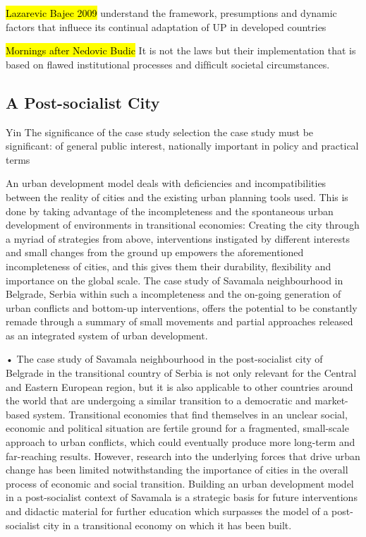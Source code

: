 \documentclass[11pt]{report}
\begin{document}
\hl{Lazarevic Bajec 2009}
understand the framework, presumptions and dynamic factors that influece its continual adaptation of UP in developed countries

\hl{Mornings after Nedovic Budic}
It is not the laws but their implementation that is based on ﬂawed institutional processes and difﬁcult societal circumstances.

\subsection{A Post-socialist City}

Yin
The significance of the case study selection
the case study must be significant: of general public interest, nationally important in policy and practical terms

An urban development model deals with deficiencies and incompatibilities between the reality of cities and the existing urban planning tools used. This is done by taking advantage of the incompleteness and the spontaneous urban development of environments in transitional economies: Creating the city through a myriad of strategies from above, interventions instigated by different interests and small changes from the ground up empowers the aforementioned incompleteness of cities, and this gives them their durability, flexibility and importance on the global scale. The case study of Savamala neighbourhood in Belgrade, Serbia within such a incompleteness and the on-going generation of urban conflicts and bottom-up interventions, offers the potential to be constantly remade through a summary of small movements and partial approaches released as an integrated system of urban development.

•	The case study of Savamala neighbourhood in the post-socialist city of Belgrade in the transitional country of Serbia is not only relevant for the Central and Eastern European region, but it is also applicable to other countries around the world that are undergoing a similar transition to a democratic and market-based system. Transitional economies that find themselves in an unclear social, economic and political situation are fertile ground for a fragmented, small-scale approach to urban conflicts, which could eventually produce more long-term and far-reaching results. However, research into the underlying forces that drive urban change has been limited notwithstanding the importance of cities in the overall process of economic and social transition. Building an urban development model in a post-socialist context of Savamala is a strategic basis for future interventions and didactic material for further education which surpasses the model of a post-socialist city in a transitional economy on which it has been built.
\end{document}
